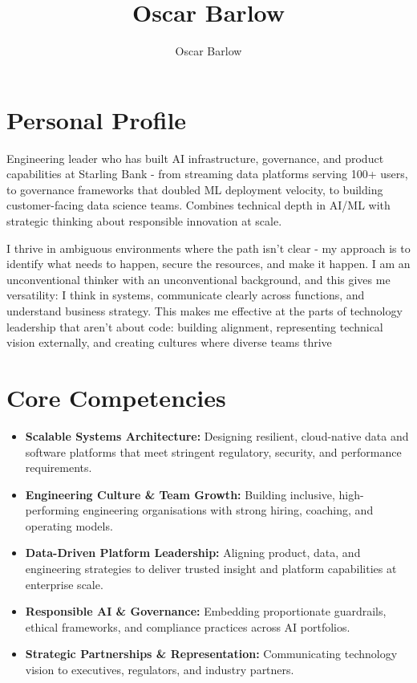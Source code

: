 \documentclass[a4paper]{scrartcl}
\author{Oscar Barlow}
\title{Oscar Barlow}
\date{}
\begin{document}
\maketitle

\section*{Personal Profile}
 { %
  \setlength{\parskip}{6pt plus 2pt minus 1pt}
Engineering leader who has built AI infrastructure, governance, and product capabilities at Starling Bank - from streaming data platforms serving 100+ users, to governance frameworks that doubled ML deployment velocity, to building customer-facing data science teams. Combines technical depth in AI/ML with strategic thinking about responsible innovation at scale.

I thrive in ambiguous environments where the path isn't clear - my approach is to identify what needs to happen, secure the resources, and make it happen. I am an unconventional thinker with an unconventional background, and this gives me versatility: I think in systems, communicate clearly across functions, and understand business strategy. This makes me effective at the parts of technology leadership that aren't about code: building alignment, representing technical vision externally, and creating cultures where diverse teams thrive
 } %

\section*{Core Competencies}
\begin{itemize}
	\item \textbf{Scalable Systems Architecture:} Designing resilient, cloud-native data and software platforms that meet stringent regulatory, security, and performance requirements.
	\item \textbf{Engineering Culture \& Team Growth:} Building inclusive, high-performing engineering organisations with strong hiring, coaching, and operating models.
	\item \textbf{Data-Driven Platform Leadership:} Aligning product, data, and engineering strategies to deliver trusted insight and platform capabilities at enterprise scale.
	\item \textbf{Responsible AI \& Governance:} Embedding proportionate guardrails, ethical frameworks, and compliance practices across AI portfolios.
		\item \textbf{Strategic Partnerships \& Representation:} Communicating technology vision to executives, regulators, and industry partners.
\end{itemize}
\end{document}
